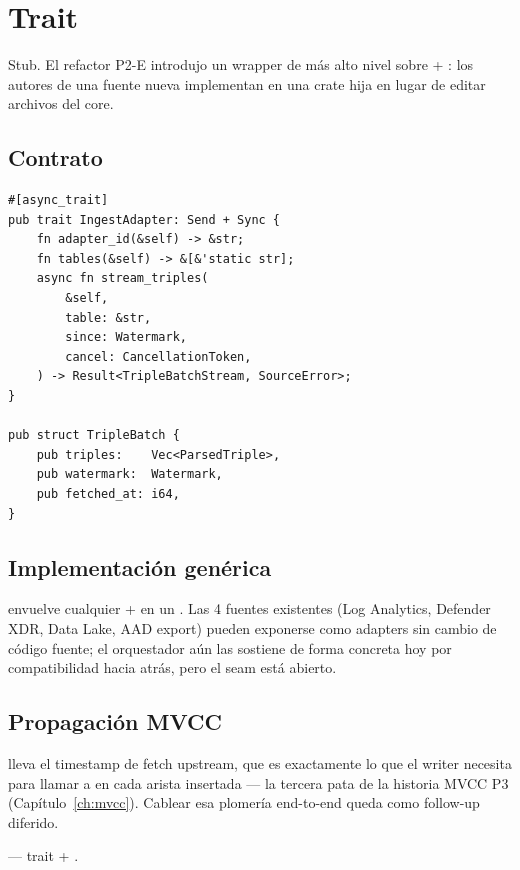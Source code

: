 \chapter{Trait }
\label{ch:ingest-adapter}

\begin{note}
Stub. El refactor P2-E introdujo un wrapper de más alto nivel
sobre  + : los autores de una
fuente nueva implementan  en una crate hija
en lugar de editar archivos del core.
\end{note}

\section{Contrato}

\begin{lstlisting}[style=rust]
#[async_trait]
pub trait IngestAdapter: Send + Sync {
    fn adapter_id(&self) -> &str;
    fn tables(&self) -> &[&'static str];
    async fn stream_triples(
        &self,
        table: &str,
        since: Watermark,
        cancel: CancellationToken,
    ) -> Result<TripleBatchStream, SourceError>;
}

pub struct TripleBatch {
    pub triples:    Vec<ParsedTriple>,
    pub watermark:  Watermark,
    pub fetched_at: i64,
}
\end{lstlisting}

\section{Implementación genérica}

 envuelve cualquier  +
 en un . Las 4 fuentes
existentes (Log Analytics, Defender XDR, Data Lake, AAD export)
pueden exponerse como adapters sin cambio de código fuente; el
orquestador aún las sostiene de forma concreta hoy por
compatibilidad hacia atrás, pero el seam está abierto.

\section{Propagación MVCC}

 lleva el timestamp de fetch
upstream, que es exactamente lo que el writer necesita para
llamar a  en cada
arista insertada --- la tercera pata de la historia MVCC P3
(Capítulo~\ref{ch:mvcc}). Cablear esa plomería end-to-end queda
como follow-up diferido.

\begin{inthecode}
 --- trait +
.
\end{inthecode}
